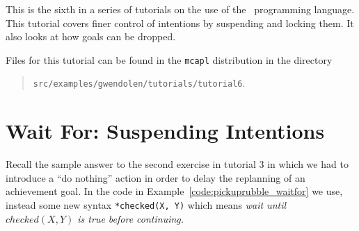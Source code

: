 
This is the sixth in a series of tutorials on the use of the \gwendolen\ programming language.  This tutorial covers finer control of intentions by suspending and locking them.  It also looks at how goals can be dropped.

Files for this tutorial can be found in the \texttt{mcapl} distribution in the directory 
\begin{quote}
\texttt{src/examples/gwendolen/tutorials/tutorial6}.
\end{quote}

\section{Wait For: Suspending Intentions}

Recall the sample answer to the second exercise in tutorial 3 in which we had to introduce a ``do nothing'' action in order to delay the replanning of an achievement goal.  In the code in Example~\ref{code:pickuprubble_waitfor} we use, instead some new syntax \lstinline{*checked(X, Y)} which means \emph{wait until $checked(X, Y)$ is true before continuing.}

